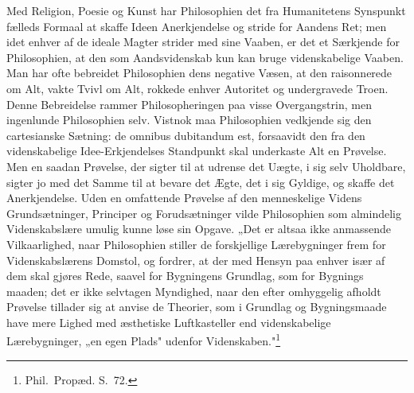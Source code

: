 \documentclass[12pt]{book}
\begin{document}
Med Religion, Poesie og Kunst har Philosophien det fra Humanitetens Synspunkt
fælleds Formaal at skaffe Ideen Anerkjendelse og stride for Aandens Ret; men idet
enhver af de ideale Magter strider med sine Vaaben, er det et Særkjende for
Philosophien, at den som Aandsvidenskab kun kan bruge videnskabelige Vaaben. Man
har ofte bebreidet Philosophien dens negative Væsen, at den raisonnerede om Alt,
vakte Tvivl om Alt, rokkede enhver Autoritet og undergravede Troen. Denne
Bebreidelse rammer Philosopheringen paa visse Overgangstrin, men ingenlunde
Philosophien selv. Vistnok maa Philosophien vedkjende sig den cartesianske Sætning:
de omnibus dubitandum est, forsaavidt den fra den videnskabelige Idee-Erkjendelses
Standpunkt skal underkaste Alt en Prøvelse. Men en saadan Prøvelse, der sigter til
at udrense det Uægte, i sig selv Uholdbare, sigter jo med det Samme til at bevare
det Ægte, det i sig Gyldige, og skaffe det Anerkjendelse. Uden en omfattende
Prøvelse af den menneskelige Videns Grundsætninger, Principer og Forudsætninger
vilde Philosophien som almindelig Videnskabslære umulig kunne løse sin Opgave. „Det
er altsaa ikke anmassende Vilkaarlighed, naar Philosophien stiller de forskjellige
Lærebygninger frem for Videnskabslærens Domstol, og fordrer, at der med Hensyn paa
enhver især af dem skal gjøres Rede, saavel for Bygningens Grundlag, som for
Bygnings%
maaden; det er ikke selvtagen Myndighed, naar den efter omhyggelig afholdt Prøvelse
tillader sig at anvise de Theorier, som i Grundlag og Bygningsmaade have mere
Lighed med æsthetiske Luftkasteller end videnskabelige Lærebygninger, „en egen
Plads" udenfor Videnskaben."\footnote{Phil.\ Propæd. S.~72.}
\end{document}
